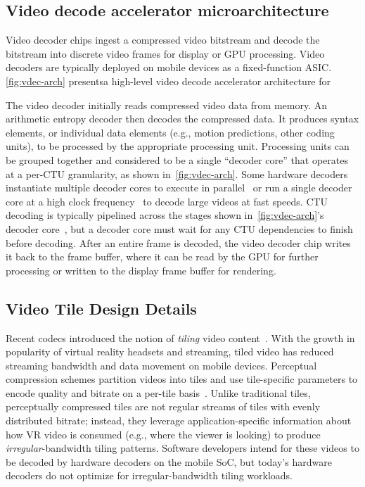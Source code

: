 \subsection{Video decode accelerator microarchitecture}
\label{subsec:vd-arch}
Video decoder chips ingest a compressed video bitstream and decode the bitstream into discrete video frames for display or GPU processing.
Video decoders are typically deployed on mobile devices as a fixed-function ASIC.
\ref{fig:vdec-arch} presentsa high-level video decode accelerator architecture for \hevc

The video decoder initially reads compressed video data from memory.
An arithmetic entropy decoder then decodes the compressed data.
It produces syntax elements, or individual data elements (e.g., motion predictions, other coding units), to be processed by the appropriate processing unit.
Processing units can be grouped together and considered to be a single ``decoder core'' that operates at a per-CTU granularity, as shown in~\ref{fig:vdec-arch}.
Some hardware decoders instantiate multiple decoder cores to execute in parallel~\cite{tikekar18ijssc} or run a single decoder core at a high clock frequency~\cite{8khevc-ijssc} to decode large videos at fast speeds.
CTU decoding is typically pipelined across the stages shown in~\ref{fig:vdec-arch}'s decoder core~\cite{8khevc-ijssc}, but a decoder core must wait for any CTU dependencies to finish before decoding.
After an entire frame is decoded, the video decoder chip writes it back to the frame buffer, where it can be read by the GPU for further processing or written to the display frame buffer for rendering.

\subsection{Video Tile Design Details}
\label{subsec:tva-tiles}

Recent codecs introduced the notion of \emph{tiling} video content~\cite{misra2013tiles}.
With the growth in popularity of virtual reality headsets and \threesixty streaming, tiled video has reduced streaming bandwidth and data movement on mobile devices.
Perceptual compression schemes partition videos into tiles and use tile-specific parameters to encode quality and bitrate on a per-tile basis~\cite{visualcloud2017haynes}.
Unlike traditional \hevc tiles, perceptually compressed tiles are not regular streams of tiles with evenly distributed bitrate; instead, they leverage application-specific information about how VR video is consumed (e.g., where the viewer is looking) to produce \emph{irregular}-bandwidth tiling patterns.
Software developers intend for these videos to be decoded by hardware decoders on the mobile SoC, but today's hardware decoders do not optimize for irregular-bandwidth tiling workloads.

